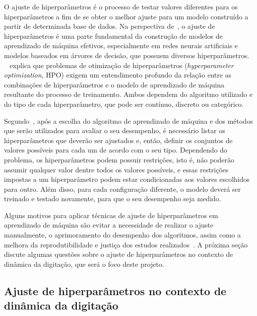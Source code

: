 O ajuste de hiperparâmetros é o processo de testar valores diferentes para os hiperparâmetros a fim de se obter o melhor ajuste para um modelo construído a partir de determinada base de dados. Na perspectiva de~, o ajuste de hiperparâmetros é uma parte fundamental da construção de modelos de aprendizado de máquina efetivos, especialmente em redes neurais artificiais e modelos baseados em árvores de decisão, que possuem diversos hiperparâmetros.
~ explica que problemas de otimização de hiperparâmetros (\textit{hyperparameter optimization}, HPO) exigem um entendimento profundo da relação entre as combinações de hiperparâmetros e o modelo de aprendizado de máquina resultante do processo de treinamento. Ambos dependem do algoritmo utilizado e do tipo de cada hiperparâmetro, que pode ser contínuo, discreto ou categórico.

Segundo~, após a escolha do algoritmo de aprendizado de máquina e dos métodos que serão utilizados para avaliar o seu desempenho, é necessário listar os hiperparâmetros que deverão ser ajustados e, então, definir os conjuntos de valores possíveis para cada um de acordo com o seu tipo. Dependendo do problema, os hiperparâmetros podem possuir restrições, isto é, não poderão assumir qualquer valor dentre todos os valores possíveis, e essas restrições impostas a um hiperparâmetro podem estar condicionadas aos valores escolhidos para outro. Além disso, para cada configuração diferente, o modelo deverá ser treinado e testado novamente, para que o seu desempenho seja medido.

Alguns motivos para aplicar técnicas de ajuste de hiperparâmetros em aprendizado de máquina são evitar a necessidade de realizar o ajuste manualmente, o aprimoramento do desempenho dos algoritmos, assim como a melhora da reprodutibilidade e justiça dos estudos realizados~. A próxima seção discute algumas questões sobre o ajuste de hiperparâmetros no contexto de dinâmica da digitação, que será o foco deste projeto.


\subsection{Ajuste de hiperparâmetros no contexto de dinâmica da digitação}\label{trabalhos_relacionados}

